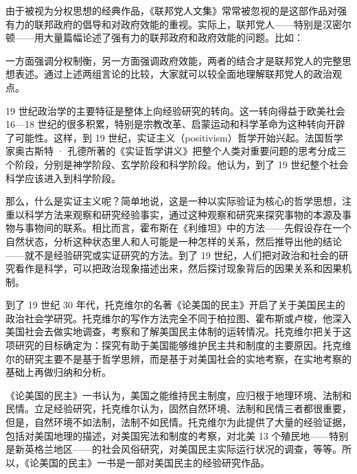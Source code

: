 由于被视为分权思想的经典作品，《联邦党人文集》常常被忽视的是这部作品对强有力的联邦政府的倡导和对政府效能的重视。实际上，联邦党人——特别是汉密尔顿——用大量篇幅论述了强有力的联邦政府和政府效能的问题。比如：


一方面强调分权制衡，另一方面强调政府效能，两者的结合才是联邦党人的完整思想表述。通过上述两组言论的比较，大家就可以较全面地理解联邦党人的政治观点。


19 世纪政治学的主要特征是整体上向经验研究的转向。这一转向得益于欧美社会 16—18 世纪的很多积累，特别是宗教改革、启蒙运动和科学革命为这种转向开辟了可能性。这样，到 19 世纪，实证主义（positivism）哲学开始兴起。法国哲学家奥古斯特 · 孔德所著的《实证哲学讲义》把整个人类对重要问题的思考分成三个阶段，分别是神学阶段、玄学阶段和科学阶段。他认为，到了 19 世纪整个社会科学应该进入到科学阶段。

那么，什么是实证主义呢？简单地说，这是一种以实际验证为核心的哲学思想，注重以科学方法来观察和研究经验事实，通过这种观察和研究来探究事物的本源及事物与事物间的联系。相比而言，霍布斯在《利维坦》中的方法——先假设存在一个自然状态，分析这种状态里人和人可能是一种怎样的关系，然后推导出他的结论——就不是经验研究或实证研究的方法。到了 19 世纪，人们把对政治和社会的研究看作是科学，可以把政治现象描述出来，然后探讨现象背后的因果关系和因果机制。

到了 19 世纪 30 年代，托克维尔的名著《论美国的民主》开启了关于美国民主的政治社会学研究。托克维尔的写作方法完全不同于柏拉图、霍布斯或卢梭，他深入美国社会去做实地调查，考察和了解美国民主体制的运转情况。托克维尔把关于这项研究的目标确定为：探究有助于美国能够维护民主共和制度的主要原因。托克维尔的研究主要不是基于哲学思辨，而是基于对美国社会的实地考察，在实地考察的基础上再做归纳和分析。

《论美国的民主》一书认为，美国之能维持民主制度，应归根于地理环境、法制和民情。立足经验研究，托克维尔认为，固然自然环境、法制和民情三者都很重要，但是，自然环境不如法制，法制不如民情。托克维尔为此提供了大量的经验证据，包括对美国地理的描述，对美国宪法和制度的考察，对北美 13 个殖民地——特别是新英格兰地区——的社会风俗研究，对美国民主实际运行状况的调查，等等。所以，《论美国的民主》一书是一部对美国民主的经验研究作品。

